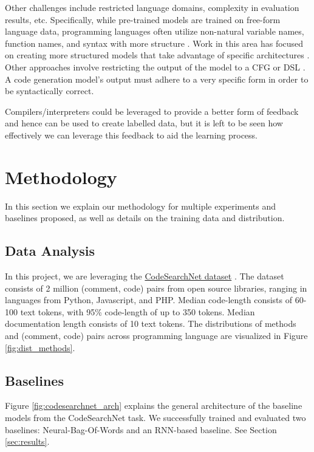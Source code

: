 \documentclass{article}
\begin{document}
Other challenges include restricted language domains, complexity in evaluation results, etc. Specifically, while pre-trained models are trained on free-form language data, programming languages often utilize non-natural variable names, function names, and syntax with more structure \cite{structural_code_modeling}. Work in this area has focused on creating more structured models that take advantage of specific architectures \cite{treegen}. Other approaches involve restricting the output of the model to a CFG or DSL \cite{grammar_based}. A code generation model’s output must adhere to a very specific form in order to be syntactically correct.

Compilers/interpreters could be leveraged to provide a better form of feedback and hence can be used to create labelled data, but it is left to be seen how effectively we can leverage this feedback to aid the learning process.

\section{Methodology}
In this section we explain our methodology for multiple experiments and baselines proposed, as well as details on the training data and distribution.

\subsection{Data Analysis}
In this project, we are leveraging the \href{https://github.com/github/CodeSearchNet}{CodeSearchNet dataset} \cite{codesearchnet}. The dataset consists of 2 million (comment, code) pairs from open source libraries, ranging in languages from Python, Javascript, and PHP. Median code-length consists of 60-100 text tokens, with 95\% code-length of up to 350 tokens. Median documentation length consists of 10 text tokens. The distributions of methods and (comment, code) pairs across programming language are visualized in Figure \ref{fig:dist_methods}.


\subsection{Baselines}
Figure \ref{fig:codesearchnet_arch} explains the general architecture of the baseline models from the CodeSearchNet task. We successfully trained and evaluated two baselines: Neural-Bag-Of-Words and an RNN-based baseline. See Section \ref{sec:results}.
\end{document}

